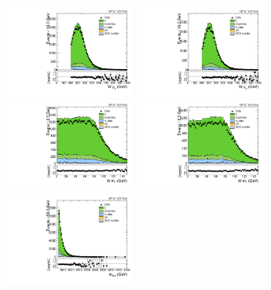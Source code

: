 \begin{figure}[htbp]
  \centering
  \includegraphics[width=0.3825\textwidth]{fig/analysisAppendix/CR_b1_mu_allP_allC_allD_Run2_lnujj_l1_pt.pdf}
  \includegraphics[width=0.3825\textwidth]{fig/analysisAppendix/CR_b1_e_allP_allC_allD_Run2_lnujj_l1_pt.pdf}\\
  \includegraphics[width=0.3825\textwidth]{fig/analysisAppendix/CR_b1_mu_allP_allC_allD_Run2_lnujj_l1_mt.pdf}
  \includegraphics[width=0.3825\textwidth]{fig/analysisAppendix/CR_b1_e_allP_allC_allD_Run2_lnujj_l1_mt.pdf}\\
  \includegraphics[width=0.3825\textwidth]{fig/analysisAppendix/CR_b1_mu_allP_allC_allD_Run2_mWV.pdf}

\end{figure}
